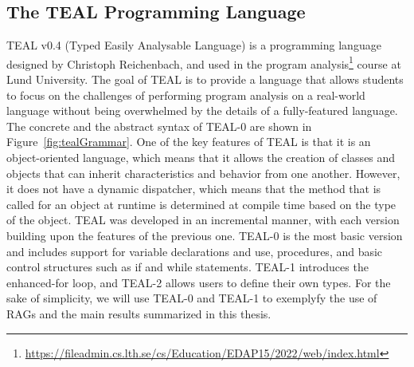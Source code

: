 \subsection{The TEAL Programming Language}
TEAL v0.4 (Typed Easily Analysable Language) is a programming language designed by Christoph Reichenbach, and  used in the
program analysis\footnote{\url{https://fileadmin.cs.lth.se/cs/Education/EDAP15/2022/web/index.html}} course at Lund University.
The goal of TEAL is to provide a language that allows students to
focus on the challenges of performing program analysis on a real-world language
without being overwhelmed by the details of a fully-featured language.
The concrete and the abstract syntax of TEAL-0 are shown in Figure~\ref{fig:tealGrammar}.
One of the key features of TEAL is that it is an object-oriented language,
which means that it allows the creation of classes and objects that can inherit
characteristics and behavior from one another. However, it does not have a dynamic
dispatcher, which means that the method that is called for an object at runtime
is determined at compile time based on the type of the object.
TEAL was developed in an incremental manner, with each version building
upon the features of the previous one. TEAL-0 is the most basic version and includes
support for variable declarations and use, procedures, and basic control structures such as if
and while statements. TEAL-1 introduces the enhanced-for loop, and TEAL-2 allows users to
define their own types.
For the sake of simplicity, we will use TEAL-0 and TEAL-1 to exemplyfy the use of RAGs 
and the main results summarized in this thesis.
\newsavebox{\mylistingbox}


